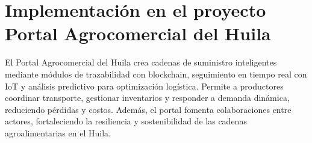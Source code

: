 \section{Implementación en el proyecto Portal Agrocomercial del Huila}

El Portal Agrocomercial del Huila crea cadenas de suministro inteligentes mediante módulos de trazabilidad con blockchain, seguimiento en tiempo real con IoT y análisis predictivo para optimización logística. Permite a productores coordinar transporte, gestionar inventarios y responder a demanda dinámica, reduciendo pérdidas y costos. Además, el portal fomenta colaboraciones entre actores, fortaleciendo la resiliencia y sostenibilidad de las cadenas agroalimentarias en el Huila.